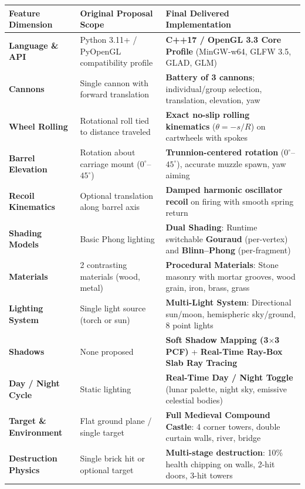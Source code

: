 \documentclass[11pt,a4paper]{article}
\begin{document}
\begin{table}[H]
\centering\small
\begin{tabular}{@{}p{38mm}p{56mm}p{56mm}@{}}
\toprule
\textbf{Feature Dimension} & \textbf{Original Proposal Scope} & \textbf{Final Delivered Implementation} \\
\midrule
\textbf{Language \& API} & Python 3.11+ / PyOpenGL compatibility profile & \textbf{C++17 / OpenGL 3.3 Core Profile} (MinGW-w64, GLFW 3.5, GLAD, GLM) \\
\textbf{Cannons} & Single cannon with forward translation & \textbf{Battery of 3 cannons}; individual/group selection, translation, elevation, yaw \\
\textbf{Wheel Rolling} & Rotational roll tied to distance traveled & \textbf{Exact no-slip rolling kinematics} ($\theta = -s/R$) on cartwheels with spokes \\
\textbf{Barrel Elevation} & Rotation about carriage mount ($0^\circ$--$45^\circ$) & \textbf{Trunnion-centered rotation} ($0^\circ$--$45^\circ$), accurate muzzle spawn, yaw aiming \\
\textbf{Recoil Kinematics} & Optional translation along barrel axis & \textbf{Damped harmonic oscillator recoil} on firing with smooth spring return \\
\textbf{Shading Models} & Basic Phong lighting & \textbf{Dual Shading}: Runtime switchable \textbf{Gouraud} (per-vertex) and \textbf{Blinn--Phong} (per-fragment) \\
\textbf{Materials} & 2 contrasting materials (wood, metal) & \textbf{Procedural Materials}: Stone masonry with mortar grooves, wood grain, iron, brass, grass \\
\textbf{Lighting System} & Single light source (torch or sun) & \textbf{Multi-Light System}: Directional sun/moon, hemispheric sky/ground, 8 point lights \\
\textbf{Shadows} & None proposed & \textbf{Soft Shadow Mapping (3$\times$3 PCF)} + \textbf{Real-Time Ray-Box Slab Ray Tracing} \\
\textbf{Day / Night Cycle} & Static lighting & \textbf{Real-Time Day / Night Toggle} (lunar palette, night sky, emissive celestial bodies) \\
\textbf{Target \& Environment} & Flat ground plane / single target & \textbf{Full Medieval Compound Castle}: 4 corner towers, double curtain walls, river, bridge \\
\textbf{Destruction Physics} & Single brick hit or optional target & \textbf{Multi-stage destruction}: 10\% health chipping on walls, 2-hit doors, 3-hit towers \\

\end{tabular}
\end{table}
\end{document}
